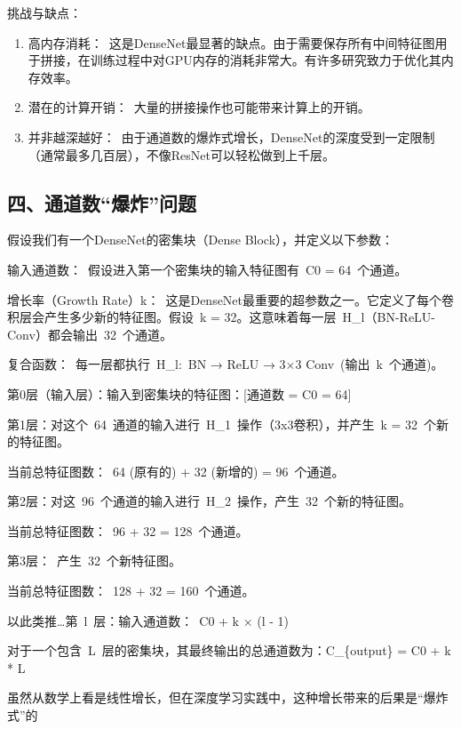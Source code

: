 挑战与缺点：

\begin{enumerate}
\def\labelenumi{\arabic{enumi}.}
\item
  高内存消耗：~这是DenseNet最显著的缺点。由于需要保存所有中间特征图用于拼接，在训练过程中对GPU内存的消耗非常大。有许多研究致力于优化其内存效率。
\item
  潜在的计算开销：~大量的拼接操作也可能带来计算上的开销。
\item
  并非越深越好：~由于通道数的爆炸式增长，DenseNet的深度受到一定限制（通常最多几百层），不像ResNet可以轻松做到上千层。
\end{enumerate}

\hypertarget{ux56dbux901aux9053ux6570ux7206ux70b8ux95eeux9898}{%
\subsection{四、通道数``爆炸''问题}\label{ux56dbux901aux9053ux6570ux7206ux70b8ux95eeux9898}}

假设我们有一个DenseNet的密集块（Dense Block），并定义以下参数：

输入通道数：~假设进入第一个密集块的输入特征图有~C0 = 64~个通道。

增长率（Growth Rate）k：~这是DenseNet最重要的超参数之一。它定义了每个卷积层会产生多少新的特征图。假设~k = 32。这意味着每一层~H\_l（BN-ReLU-Conv）都会输出~32~个通道。

复合函数：~每一层都执行~H\_l:~BN → ReLU → 3×3 Conv~(输出~k~个通道)。

第0层（输入层）：输入到密集块的特征图：{[}通道数 = C0 = 64{]}

第1层：对这个~64~通道的输入进行~H\_1~操作（3x3卷积），并产生~k = 32~个新的特征图。

当前总特征图数：~64 (原有的) + 32 (新增的) = 96~个通道。

第2层：对这~96~个通道的输入进行~H\_2~操作，产生~32~个新的特征图。

当前总特征图数：~96 + 32 = 128~个通道。

第3层：~产生~32~个新特征图。

当前总特征图数：~128 + 32 = 160~个通道。

以此类推\ldots 第~l~层：输入通道数：~C0 + k × (l - 1)

对于一个包含~L~层的密集块，其最终输出的总通道数为：C\_\{output\} = C0 + k * L

虽然从数学上看是线性增长，但在深度学习实践中，这种增长带来的后果是``爆炸式''的

